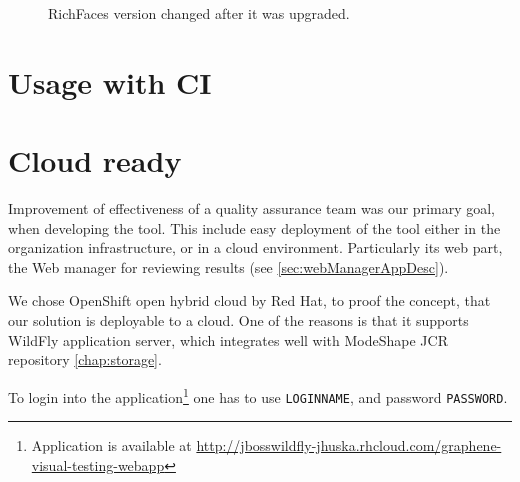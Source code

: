 \documentclass[11pt,oneside,final]{fithesis2}
\begin{document}
  \begin{figure}[!htb]
      \begin{center}
      \leavevmode
      \centerline{}
      \end{center}
      \caption{RichFaces version changed after it was upgraded.}
      \label{fig:rfVersionChanged}
  \end{figure}

  \section{Usage with CI}
    
  \section{Cloud ready}
  \label{sec:cloudReady}
  Improvement of effectiveness of a quality assurance team was our primary goal, when developing the tool. This include easy 
  deployment of the tool either in the organization infrastructure, or in a cloud environment. Particularly its web part, the
  Web manager for reviewing results (see \ref{sec:webManagerAppDesc}).
  
  We chose OpenShift open hybrid cloud by Red Hat, to proof the concept, that our solution is deployable to a cloud. One of the
  reasons is that it supports WildFly application server, which integrates well with ModeShape JCR repository \ref{chap:storage}.
  
  To login into the application\footnote{Application is available at 
  \url{http://jbosswildfly-jhuska.rhcloud.com/graphene-visual-testing-webapp}} one has to 
  use \texttt{LOGINNAME}, and password \texttt{PASSWORD}.
  
\end{document}
